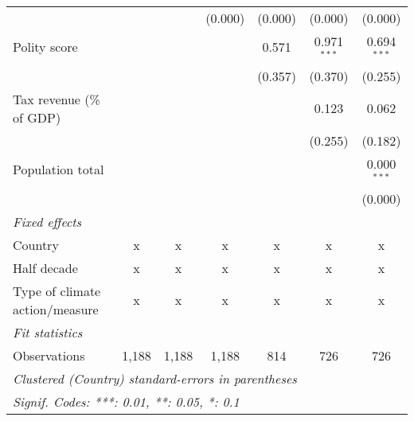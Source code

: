 \begin{tabular}{lcccccc}
                                                                                &             &              & (0.000)       & (0.000)        & (0.000)        & (0.000)\\   
   Polity score                                                                 &             &              &               & 0.571          & 0.971$^{***}$  & 0.694$^{***}$\\   
                                                                                &             &              &               & (0.357)        & (0.370)        & (0.255)\\   
   Tax revenue (\% of GDP)                                                      &             &              &               &                & 0.123          & 0.062\\   
                                                                                &             &              &               &                & (0.255)        & (0.182)\\   
   Population total                                                             &             &              &               &                &                & 0.000$^{***}$\\   
                                                                                &             &              &               &                &                & (0.000)\\   
   \emph{Fixed effects}\\
   Country                                                                      & x           & x            & x             & x              & x              & x\\  
   Half decade                                                                  & x           & x            & x             & x              & x              & x\\  
   Type of climate action/measure                                               & x           & x            & x             & x              & x              & x\\  
   \midrule \emph{Fit statistics}\\
   Observations                                                                 & 1,188       & 1,188        & 1,188         & 814            & 726            & 726\\  
   \midrule
   \multicolumn{7}{l}{\emph{Clustered (Country) standard-errors in parentheses}}\\
   \multicolumn{7}{l}{\emph{Signif. Codes: ***: 0.01, **: 0.05, *: 0.1}}\\
\end{tabular}
\par\endgroup


